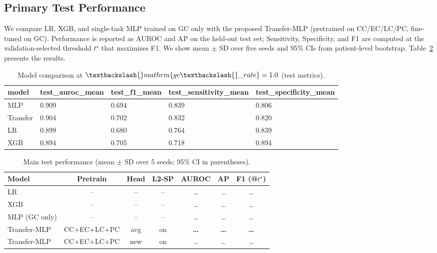 \documentclass[journal,article,submit,pdftex,moreauthors]{Definitions/mdpi}
\begin{document}
\subsection{Primary Test Performance}
We compare LR, XGB, and single-task MLP trained on GC only with the proposed Transfer-MLP (pretrained on CC/EC/LC/PC, fine-tuned on GC).
Performance is reported as AUROC and AP on the held-out test set;
Sensitivity, Specificity, and F1 are computed at the validation-selected threshold $t^\star$ that maximizes F1. %
We show mean $\pm$ SD over five seeds and 95\% CIs from patient-level bootstrap.
Table~\ref{tab:main} presents the results.

\begin{table}[t]
\centering
\small
\begin{tabular}{lllll}
\toprule
model & test\_auroc\_mean & test\_f1\_mean & test\_sensitivity\_mean & test\_specificity\_mean \\
\midrule
MLP & 0.909 & 0.694 & 0.839 & 0.806 \\
Transfer & 0.904 & 0.702 & 0.832 & 0.820 \\
LR & 0.899 & 0.680 & 0.764 & 0.839 \\
XGB & 0.894 & 0.705 & 0.718 & 0.894 \\
\bottomrule
\end{tabular}

\caption{Model comparison at $\textbackslash\{\}mathrm\{gc\textbackslash\{\}\_rate\}=1.0$ (test metrics).}
\label{tab:model-compare-gc1}
\end{table}


\begin{table}[H]
\caption{Main test performance (mean $\pm$ SD over 5 seeds; 95\% CI in parentheses).}
\label{tab:main}
\centering
\begin{tabular}{lcccccc}
\toprule
Model & Pretrain & Head & L2-SP & AUROC & AP & F1 (@$t^\star$) \\
\midrule
LR & -- & -- & -- & \dots & \dots & \dots \\
XGB & -- & -- & -- & \dots & \dots & \dots \\
MLP (GC only) & -- & -- & -- & \dots & \dots & \dots \\
Transfer-MLP & CC+EC+LC+PC & avg & on & \textbf{\dots} & \textbf{\dots} & \textbf{\dots} \\
Transfer-MLP & CC+EC+LC+PC & new & on & \dots & \dots & \dots \\
\bottomrule
\end{tabular}
\end{table}
\end{document}

